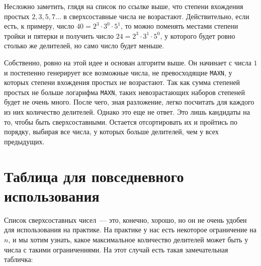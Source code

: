 Несложно заметить, глядя на список по ссылке выше, что степени вхождения простых $2, 3, 5, 7 \ldots$ в сверхсоставные числа не возрастают. Действительно, если есть, к примеру, число $40 = 2^3 \cdot 3^0 \cdot 5^1$, то можно поменять местами степени тройки и пятерки и получить число $24 = 2^3 \cdot 3^1 \cdot 5^0$, у которого будет ровно столько же делителей, но само число будет меньше.

Собственно, ровно на этой идее и основан алгоритм выше. Он начинает с числа $1$ и постепенно генерирует все возможные числа, не превосходящие \verb+MAXN+, у которых степени вхождения простых не возрастают. Так как сумма степеней простых не больше логарифма \verb+MAXN+, таких невозрастающих наборов степеней будет не очень много. После чего, зная разложение, легко посчитать для каждого из них количество делителей. Однако это еще не ответ. Это лишь кандидаты на то, чтобы быть сверхсоставными. Остается отсортировать их и пройтись по порядку, выбирая все числа, у которых больше делителей, чем у всех предыдущих.

\section{Таблица для повседневного использования}

Список сверхсоставных чисел~--- это, конечно, хорошо, но он не очень удобен для использования на практике. На практике у нас есть некоторое ограничение на $n$, и мы хотим узнать, какое максимальное количество делителей может быть у числа с такими ограничениями. На этот случай есть такая замечательная табличка:

